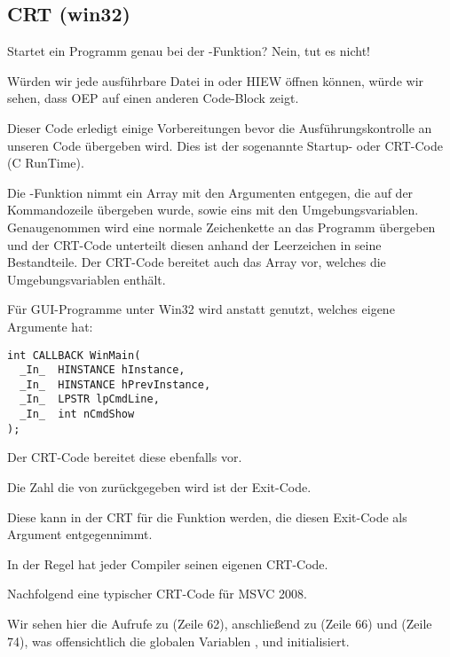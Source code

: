 \subsection{CRT (win32)}
\label{sec:CRT}

Startet ein Programm genau bei der \main{}-Funktion?
Nein, tut es nicht!

Würden wir jede ausführbare Datei in \IDA oder HIEW öffnen können, würde wir sehen,
dass \ac{OEP} auf einen anderen Code-Block zeigt.

Dieser Code erledigt einige Vorbereitungen bevor die Ausführungskontrolle an unseren
Code übergeben wird.
Dies ist der sogenannte Startup- oder CRT-Code (C RunTime).

Die \main{}-Funktion nimmt ein Array mit den Argumenten entgegen, die auf der Kommandozeile
übergeben wurde, sowie eins mit den Umgebungsvariablen.
Genaugenommen wird eine normale Zeichenkette an das Programm übergeben und der CRT-Code
unterteilt diesen anhand der Leerzeichen in seine Bestandteile.
Der CRT-Code bereitet auch das Array  vor, welches die Umgebungsvariablen enthält.

Für \ac{GUI}-Programme unter Win32 wird  anstatt \main{} genutzt, welches eigene
Argumente hat:

\begin{lstlisting}
int CALLBACK WinMain(
  _In_  HINSTANCE hInstance,
  _In_  HINSTANCE hPrevInstance,
  _In_  LPSTR lpCmdLine,
  _In_  int nCmdShow
);
\end{lstlisting}

Der CRT-Code bereitet diese ebenfalls vor.

Die Zahl die von \main{} zurückgegeben wird ist der Exit-Code.

Diese kann in der CRT für die Funktion  werden, die diesen Exit-Code als
Argument entgegennimmt.

In der Regel hat jeder Compiler seinen eigenen CRT-Code.

Nachfolgend eine typischer CRT-Code für MSVC 2008.

%


Wir sehen hier die Aufrufe zu  (Zeile 62), anschließend zu 
(Zeile 66) und  (Zeile 74), was offensichtlich die globalen Variablen ,
 und   initialisiert.

